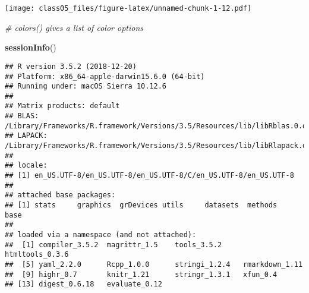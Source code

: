 \documentclass[]{article}
\newenvironment{Shaded}{\begin{snugshade}}{\end{snugshade}}
\newcommand{\KeywordTok}[1]{\textcolor[rgb]{0.13,0.29,0.53}{\textbf{#1}}}
\newcommand{\DataTypeTok}[1]{\textcolor[rgb]{0.13,0.29,0.53}{#1}}
\newcommand{\StringTok}[1]{\textcolor[rgb]{0.31,0.60,0.02}{#1}}
\newcommand{\CommentTok}[1]{\textcolor[rgb]{0.56,0.35,0.01}{\textit{#1}}}
\newcommand{\OperatorTok}[1]{\textcolor[rgb]{0.81,0.36,0.00}{\textbf{#1}}}
\newcommand{\NormalTok}[1]{#1}
\begin{document}
\begin{Shaded}
\end{Shaded}

\texttt{[image: class05\_files/figure-latex/unnamed-chunk-1-12.pdf]}

\begin{Shaded}
\begin{Highlighting}[]
\CommentTok{# colors() gives a list of color options}

\KeywordTok{sessionInfo}\NormalTok{()}
\end{Highlighting}
\end{Shaded}

\begin{verbatim}
## R version 3.5.2 (2018-12-20)
## Platform: x86_64-apple-darwin15.6.0 (64-bit)
## Running under: macOS Sierra 10.12.6
## 
## Matrix products: default
## BLAS: /Library/Frameworks/R.framework/Versions/3.5/Resources/lib/libRblas.0.dylib
## LAPACK: /Library/Frameworks/R.framework/Versions/3.5/Resources/lib/libRlapack.dylib
## 
## locale:
## [1] en_US.UTF-8/en_US.UTF-8/en_US.UTF-8/C/en_US.UTF-8/en_US.UTF-8
## 
## attached base packages:
## [1] stats     graphics  grDevices utils     datasets  methods   base     
## 
## loaded via a namespace (and not attached):
##  [1] compiler_3.5.2  magrittr_1.5    tools_3.5.2     htmltools_0.3.6
##  [5] yaml_2.2.0      Rcpp_1.0.0      stringi_1.2.4   rmarkdown_1.11 
##  [9] highr_0.7       knitr_1.21      stringr_1.3.1   xfun_0.4       
## [13] digest_0.6.18   evaluate_0.12
\end{verbatim}
\end{document}
